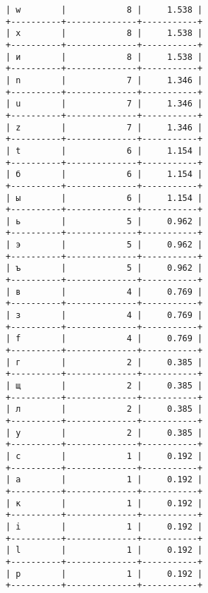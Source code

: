 \documentclass[a4paper, 14pt]{report}
\begin{document}
\begin{lstlisting}[frame=false]
| w        |            8 |     1.538 |
+----------+--------------+-----------+
| x        |            8 |     1.538 |
+----------+--------------+-----------+
| и        |            8 |     1.538 |
+----------+--------------+-----------+
| n        |            7 |     1.346 |
+----------+--------------+-----------+
| u        |            7 |     1.346 |
+----------+--------------+-----------+
| z        |            7 |     1.346 |
+----------+--------------+-----------+
| t        |            6 |     1.154 |
+----------+--------------+-----------+
| б        |            6 |     1.154 |
+----------+--------------+-----------+
| ы        |            6 |     1.154 |
+----------+--------------+-----------+
| ь        |            5 |     0.962 |
+----------+--------------+-----------+
| э        |            5 |     0.962 |
+----------+--------------+-----------+
| ъ        |            5 |     0.962 |
+----------+--------------+-----------+
| в        |            4 |     0.769 |
+----------+--------------+-----------+
| з        |            4 |     0.769 |
+----------+--------------+-----------+
| f        |            4 |     0.769 |
+----------+--------------+-----------+
| г        |            2 |     0.385 |
+----------+--------------+-----------+
| щ        |            2 |     0.385 |
+----------+--------------+-----------+
| л        |            2 |     0.385 |
+----------+--------------+-----------+
| y        |            2 |     0.385 |
+----------+--------------+-----------+
| c        |            1 |     0.192 |
+----------+--------------+-----------+
| a        |            1 |     0.192 |
+----------+--------------+-----------+
| к        |            1 |     0.192 |
+----------+--------------+-----------+
| i        |            1 |     0.192 |
+----------+--------------+-----------+
| l        |            1 |     0.192 |
+----------+--------------+-----------+
| p        |            1 |     0.192 |
+----------+--------------+-----------+


\end{lstlisting}
\end{document}
